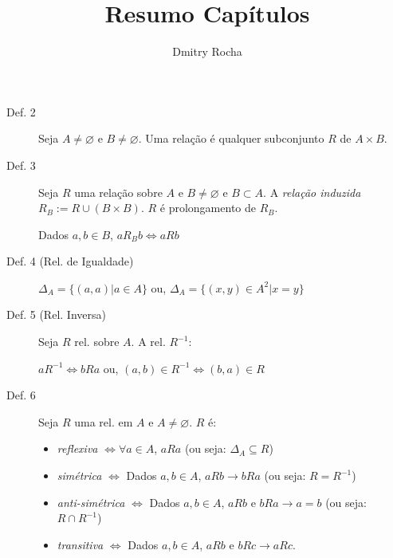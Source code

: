 \documentclass[11pt]{article}
\author{Dmitry Rocha}
\title{Resumo Capítulos}
\begin{document}
\newcommand{\defi}{Def. }
\newcommand{\prop}{P}
\newcommand{\teor}{T}
\newcommand{\coro}{C}
\newcommand{\lema}{L}
\newcommand{\obse}{Obs.}

\maketitle




\begin{description}
  \item[\defi 2] Seja $A \neq \varnothing$ e $B \neq \varnothing$. Uma relação é
    qualquer subconjunto $R$ de $A \times B$.
  \item[\defi 3] Seja $R$ uma relação sobre $A$ e $B \neq \varnothing$ e $B \subset
    A$. A \emph{relação induzida} $R_B := R \cup (B\times B)$. $R$ é
    prolongamento de $R_B$.

    Dados $a,b \in B$, $aR_B b \iff aRb$

  \item[\defi 4 (Rel. de Igualdade)]

    $\Delta _A = \{ (a, a) | a \in A\}$ ou,
    $\Delta _A = \{(x, y) \in A^2 | x = y\}$

  \item[\defi 5 (Rel. Inversa)] Seja $R$ rel. sobre $A$. A rel. $R^{-1}$:

    $aR^{-1} \iff bRa$ ou,
    $(a, b) \in R^{-1} \iff (b,a) \in R$

  \item[\defi 6] Seja $R$ uma rel. em $A$ e $A\neq \varnothing$. $R$ é:
    \begin{itemize}
      \item \emph{reflexiva} $\iff \forall a \in A$, $aRa$ (ou seja: $\Delta _A
        \subseteq R$)
      \item \emph{simétrica} $\iff$ Dados $a, b \in A$, $aRb \to bRa$ (ou seja:
        $R=R^{-1}$)
      \item \emph{anti-simétrica} $\iff$ Dados $a, b \in A$, $aRb$ e $bRa \to a
        = b$ (ou seja: $R \cap R^{-1}$)
      \item \emph{transitiva} $\iff$ Dados $a, b \in A$, $aRb$ e $bRc \to aRc$.
    \end{itemize}
\end{description}

\end{document}

